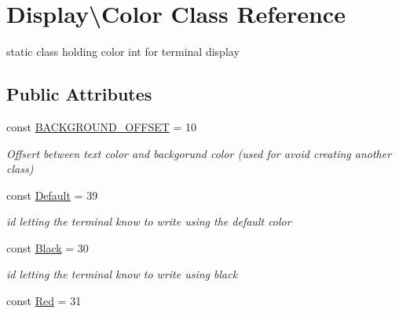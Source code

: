\hypertarget{classDisplay_1_1Color}{}\section{Display\textbackslash{}Color Class Reference}
\label{classDisplay_1_1Color}


static class holding color int for terminal display  


\subsection*{Public Attributes}
\begin{DoxyCompactItemize}
\item 
\mbox{\label{classDisplay_1_1Color_aeaa09b4902c94778eda993ae01af2dfb}} 
const \hyperlink{classDisplay_1_1Color_aeaa09b4902c94778eda993ae01af2dfb}{B\+A\+C\+K\+G\+R\+O\+U\+N\+D\+\_\+\+O\+F\+F\+S\+ET} = 10
\begin{DoxyCompactList}\small\item\em Offsert between text color and backgorund color (used for avoid creating another class) \end{DoxyCompactList}\item 
\mbox{\label{classDisplay_1_1Color_a667403f6acc19e11a5edeae75ca44c6d}} 
const \hyperlink{classDisplay_1_1Color_a667403f6acc19e11a5edeae75ca44c6d}{Default} = 39
\begin{DoxyCompactList}\small\item\em id letting the terminal know to write using the default color \end{DoxyCompactList}\item 
\mbox{\label{classDisplay_1_1Color_afc2c98adc048bfe0d7c627239781ca10}} 
const \hyperlink{classDisplay_1_1Color_afc2c98adc048bfe0d7c627239781ca10}{Black} = 30
\begin{DoxyCompactList}\small\item\em id letting the terminal know to write using black \end{DoxyCompactList}\item 
\mbox{\label{classDisplay_1_1Color_a6b0b1dff4e3cfd9f0b7fb118c8c23e9b}} 
const \hyperlink{classDisplay_1_1Color_a6b0b1dff4e3cfd9f0b7fb118c8c23e9b}{Red} = 31

\end{DoxyCompactItemize}
